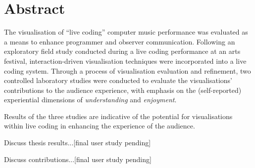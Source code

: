 
\chapter*{Abstract}
\label{chap:abstract}


The visualisation of ``live coding'' computer music performance was evaluated as a means to enhance programmer and observer communication. Following an exploratory field study conducted during a live coding performance at an arts festival, interaction-driven visualisation techniques were incorporated into a live coding system. Through a process of visualisation evaluation and refinement, two controlled laboratory studies were conducted to evaluate the visualisations' contributions to the audience experience, with emphasis on the (self-reported) experiential dimensions of \emph{understanding} and \emph{enjoyment}.

Results of the three studies are indicative of the potential for visualisations within live coding in enhancing the experience of the audience.

Discuss thesis results...[final user study pending]

Discuss contributions...[final user study pending]